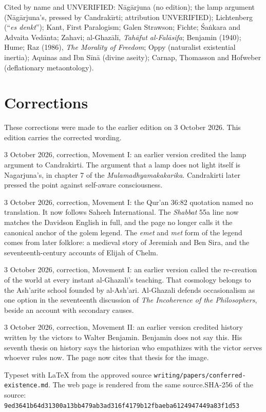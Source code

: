 \documentclass[11pt]{article}
\begin{document}
Cited by name and UNVERIFIED: Nāgārjuna (no edition); the lamp argument (Nāgārjuna's, pressed by Candrakīrti; attribution UNVERIFIED); Lichtenberg (``\emph{es denkt}''); Kant, First Paralogism; Galen Strawson; Fichte; Śaṅkara and Advaita Vedānta; Zahavi; al-Ghazālī, \emph{Tahāfut al-Falāsifa}; Benjamin (1940); Hume; Raz (1986), \emph{The Morality of Freedom}; Oppy (naturalist existential inertia); Aquinas and Ibn Sīnā (divine aseity); Carnap, Thomasson and Hofweber (deflationary metaontology).

\section*{Corrections}
These corrections were made to the earlier edition on 3 October 2026. This edition carries the corrected wording.

3 October 2026, correction, Movement I: an earlier version credited the lamp argument to Candrakirti. The argument that a lamp does not light itself is Nagarjuna's, in chapter 7 of the \emph{Mulamadhyamakakarika}. Candrakirti later pressed the point against self-aware consciousness.

3 October 2026, correction, Movement I: the Qur'an 36:82 quotation named no translation. It now follows Saheeh International. The \emph{Shabbat} 55a line now matches the Davidson English in full, and the page no longer calls it the canonical anchor of the golem legend. The \emph{emet} and \emph{met} form of the legend comes from later folklore: a medieval story of Jeremiah and Ben Sira, and the seventeenth-century accounts of Elijah of Chelm.

3 October 2026, correction, Movement I: an earlier version called the re-creation of the world at every instant al-Ghazali's teaching. That cosmology belongs to the Ash'arite school founded by al-Ash'ari. Al-Ghazali defends occasionalism as one option in the seventeenth discussion of \emph{The Incoherence of the Philosophers}, beside an account with secondary causes.

3 October 2026, correction, Movement II: an earlier version credited history written by the victors to Walter Benjamin. Benjamin does not say this. His seventh thesis on history says the historian who empathizes with the victor serves whoever rules now. The page now cites that thesis for the image.

\vfill{\footnotesize Typeset with LaTeX from the approved source \texttt{writing/papers/conferred-existence.md}. The web page is rendered from the same source.\newline SHA-256 of the source: \texttt{9ed3641b64d31300a13bb479ab3ad316f4179b12fbaeba6124947449a83f1d53}\par}
\end{document}
